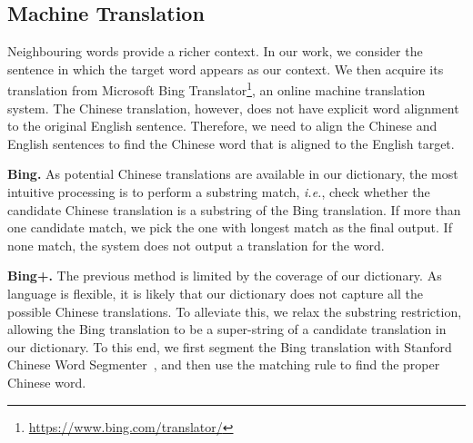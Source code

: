 \begin{CJK}{UTF8}{gbsn}
\subsection{Machine Translation}
Neighbouring words provide a richer context. In our work, we consider the sentence in which the target word appears as our context. We then acquire its  translation from Microsoft Bing Translator\footnote{\url{https://www.bing.com/translator/}}, an online machine translation system. The Chinese translation, however, does not have explicit word alignment to the original English sentence. Therefore, we need to align the Chinese and English sentences to find the Chinese word that is aligned to the English target.

{\bf Bing.} As potential Chinese translations are available in our dictionary, the most intuitive processing is to perform a substring match, {\it i.e.}, check whether the candidate Chinese translation is a substring of the Bing translation. If more than one candidate match, we pick the one with longest match as the final output. If none match, the system does not output a translation for the word.

{\bf Bing+.} The previous method is limited by the coverage of our dictionary. As language is flexible, it is likely that our dictionary does not capture all the possible Chinese translations. To alleviate this, we relax the substring restriction, allowing the Bing translation to be a super-string of a candidate translation in our dictionary. To this end, we first segment the Bing translation with Stanford Chinese Word Segmenter~\cite{Chang2008}, and then use the matching rule to find the proper Chinese word. 



\end{CJK}
